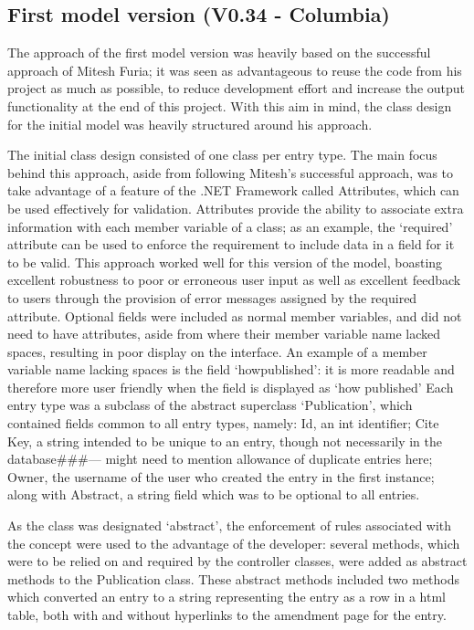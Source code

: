 \documentclass{l4proj}
\newcommand{\revisit}{\#\#\#}
\begin{document}
\subsection{First model version (V0.34 - Columbia)}
The approach of the first model version was heavily based on the successful approach of Mitesh Furia; it was seen as advantageous to reuse the code from his project as much as possible, to reduce development effort and increase the output functionality at the end of this project.  With this aim in mind, the class design for the initial model was heavily structured around his approach.

The initial class design consisted of one class per entry type.  The main focus behind this approach, aside from following Mitesh's successful approach, was to take advantage of a feature of the .NET Framework called Attributes, which can be used effectively for validation.  Attributes provide the ability to associate extra information with each member variable of a class; as an example, the `required' attribute can be used to enforce the requirement to include data in a field for it to be valid.  This approach worked well for this version of the model, boasting excellent robustness to poor or erroneous user input as well as excellent feedback to users through the provision of error messages assigned by the required attribute.  Optional fields were included as normal member variables, and did not need to have attributes, aside from where their member variable name lacked spaces, resulting in poor display on the interface.  An example of a member variable name lacking spaces is the field `howpublished': it is more readable and therefore more user friendly when the field is displayed as `how published' 
Each entry type was a subclass of the abstract superclass `Publication', which contained fields common to all entry types, namely: Id, an int identifier; Cite Key, a string intended to be unique to an entry, though not necessarily in the database\revisit --- might need to mention allowance of duplicate entries here; Owner, the username of the user who created the entry in the first instance; along with Abstract, a string field which was to be optional to all entries.

As the class was designated `abstract', the enforcement of rules associated with the concept were used to the advantage of the developer: several methods, which were to be relied on and required by the controller classes, were added as abstract methods to the Publication class.  These abstract methods included two methods which converted an entry to a string representing the entry as a row in a \gls{html} table, both with and without hyperlinks to the amendment page for the entry.
\end{document}
